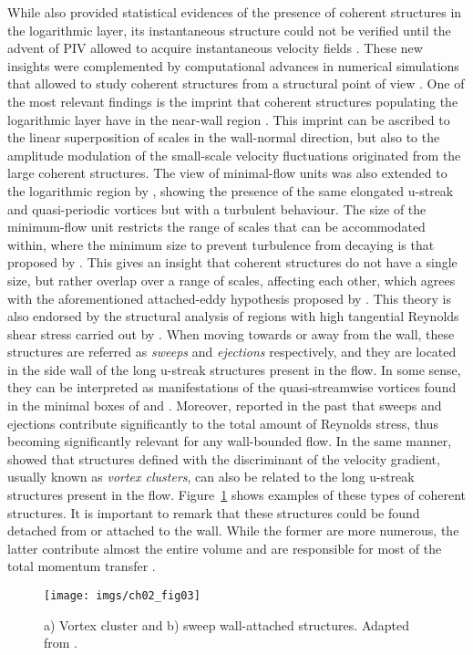While \citet{blackwelder1972time} also provided statistical evidences of the presence of coherent structures in the logarithmic layer, its instantaneous structure could not be verified until the advent of PIV allowed to acquire instantaneous velocity fields \citep{ganapathisubramani2003characteristics, tomkins2003spanwise}.
These new insights were complemented by computational advances in numerical simulations that allowed to study coherent structures from a structural point of view \citep{hoyas2006scaling}.
One of the most relevant findings is the imprint that coherent structures populating the logarithmic layer have in the near-wall region \citep{hoyas2006scaling, hoyas2008reynolds,hutchins2007large, mathis2009large,dogan2019quantification}.
This imprint can be ascribed to the linear superposition of scales in the wall-normal direction, but also to the amplitude modulation of the small-scale velocity fluctuations originated from the large coherent structures.
The view of minimal-flow units was also extended to the logarithmic region by \citet{flores2010hierarchy}, showing the presence of the same elongated u-streak and quasi-periodic vortices but with a turbulent behaviour.
The size of the minimum-flow unit restricts the range of scales that can be accommodated within, where the minimum size to prevent turbulence from decaying is that proposed by \citet{jimenez1991minimal}.
This gives an insight that coherent structures do not have a single size, but rather overlap over a range of scales, affecting each other, which agrees with the aforementioned attached-eddy hypothesis proposed by \citet{townsend1976structure}.
This theory is also endorsed by the structural analysis of regions with high tangential Reynolds shear stress carried out by \citet{lozano2012three}.
When moving towards or away from the wall, these structures are referred as \textit{sweeps} and \textit{ejections} respectively, and they are located in the side wall of the long u-streak structures present in the flow.
In some sense, they can be interpreted as manifestations of the quasi-streamwise vortices found in the minimal boxes of \cite{jimenez1991minimal} and \citet{flores2010hierarchy}.
Moreover, \citet{ganapathisubramani2003characteristics} reported in the past that sweeps and ejections contribute significantly to the total amount of Reynolds stress, thus becoming significantly relevant for any wall-bounded flow.
In the same manner, \citet{del2006self} showed that structures defined with the discriminant of the velocity gradient, usually known as \textit{vortex clusters}, can also be related to the long u-streak structures present in the flow.
Figure~\ref{ch02:fig03} shows examples of these types of coherent structures.
It is important to remark that these structures could be found detached from or attached to the wall.
While the former are more numerous, the latter contribute almost the entire volume and are responsible for most of the total momentum transfer \citep{lozano2014time}.
\begin{figure}
  \centering
  \texttt{[image: imgs/ch02\_fig03]}
  \caption{\label{ch02:fig03} a) Vortex cluster and b) sweep wall-attached structures. Adapted from \citet{lozano2014time}.}
\end{figure}

